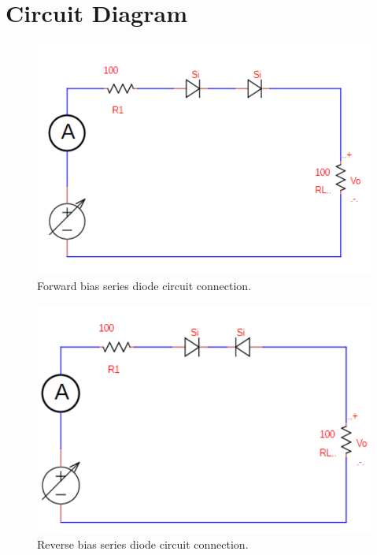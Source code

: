 \section{Circuit Diagram}
\begin{figure}[H]
    \centering
    \includegraphics[scale=0.3]{src/exp03/fig1.png}
    \caption{Forward bias series diode circuit connection.}
\end{figure}

\begin{figure}[H]
    \centering
    \includegraphics[scale=0.3]{src/exp03/fig2.png}
    \caption{Reverse bias series diode circuit connection.}
\end{figure}


